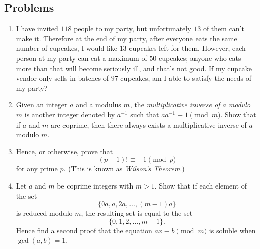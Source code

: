 \subsection{Problems}
\begin{enumerate}
\item I have invited
  \(118\) people to my party, but unfortunately \(13\) of them can't make it.
  Therefore at the end of my party, after everyone eats the same number of cupcakes, I would like \(13\) cupcakes left for them.
  However, each person at my party can eat a maximum of \(50\) cupcakes; anyone who eats more than that will become seriously ill, and that's not good. If my cupcake vendor only
  sells in batches of \(97\) cupcakes, am I able to satisfy the needs of my party?

\item Given an integer \(a\) and a modulus \(m\), the \emph{multiplicative inverse of \(a\) modulo \(m\)}
  is another integer denoted by \(a^{-1}\) such that \(aa^{-1}\equiv1\pmod{m}\). Show that if \(a\) and \(m\) are coprime, then there always exists
  a multiplicative inverse of \(a\) modulo \(m\).
\item Hence, or otherwise, prove that
  \[(p-1)!\equiv-1\pmod{p}\]
  for any prime \(p\). (This is known as \emph{Wilson's Theorem}.)
\item Let \(a\) and \(m\) be coprime integers with \(m>1\). Show that if each element of the  set \[\{0a, a, 2a, \ldots,(m-1)a\}\] is reduced modulo \(m\), the resulting set
  is equal to the set \[\{0,1,2,\ldots,m-1\}.\] 
  Hence find a second proof that the equation \(ax\equiv b\pmod{m}\) is soluble when \(\gcd(a,b)=1\).
\end{enumerate}
